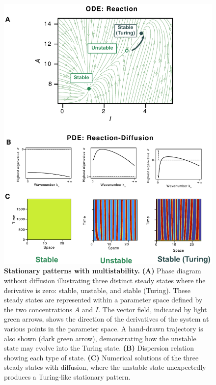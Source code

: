 \begin{figure}[H]
    \includegraphics[width=1\textwidth]{figures/multistability1}

    \caption{\textbf{Stationary patterns with multistability.} \textbf{(A)} Phase diagram without diffusion illustrating three distinct steady states where the derivative is zero: stable, unstable, and stable (Turing). These steady states are represented within a parameter space defined by the two concentrations $A$ and $I$. The vector field, indicated by light green arrows, shows the direction of the derivatives of the system at various points in the parameter space. A hand-drawn trajectory is also shown (dark green arrow), demonstrating how the unstable state may evolve into the Turing state. \textbf{(B)} Dispersion relation showing each type of state. \textbf{(C)} Numerical solutions of the three steady states with diffusion, where the unstable state unexpectedly produces a Turing-like stationary pattern. }
    \label{fig:multistability1} %
\end{figure}


